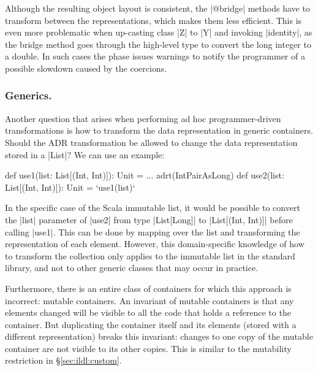 
Although the resulting object layout is consistent, the |@bridge| methods have to transform between the representations, which makes them less efficient. This is even more problematic when up-casting class |Z| to |Y| and invoking |identity|, as the bridge method goes through the high-level type to convert the long integer to a double. In such cases the \bridge{} phase issues warnings to notify the programmer of a possible slowdown caused by the coercions.

\subsubsection{Generics.}
\label{sec:ildl:language-generics}
Another question that arises when performing ad hoc programmer-driven transformations is how to transform the data representation in generic containers. Should the ADR transformation be allowed to change the data representation stored in a |List|? We can use an example:

\begin{lstlisting-nobreak}
def use1(list: List[(Int, Int)]): Unit = ...
adrt(IntPairAsLong) {
  def use2(list: List[(Int, Int)]): Unit = `use1(list)`
}
\end{lstlisting-nobreak}

In the specific case of the Scala immutable list, it would be possible to convert the |list| parameter of |use2| from type |List[Long]| to |List[(Int, Int)]| before calling |use1|. This can be done by mapping over the list and transforming the representation of each element. However, this domain-specific knowledge of how to transform the collection only applies to the immutable list in the standard library, and not to other generic classes that may occur in practice.

Furthermore, there is an entire class of containers for which this approach is incorrect: mutable containers. An invariant of mutable containers is that any elements changed will be visible to all the code that holds a reference to the container. But duplicating the container itself and its elements (stored with a different representation) breaks this invariant: changes to one copy of the mutable container are not visible to its other copies. This is similar to the mutability restriction in \S\ref{sec:ildl:custom}.

